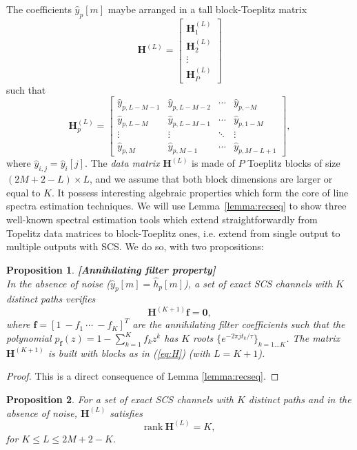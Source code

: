 \documentclass[journal,10pt]{IEEEtran}
\providecommand{\mat}[1]{\boldsymbol{#1}}
\providecommand{\vct}[1]{\boldsymbol{#1}}
\newtheorem{proposition}{Proposition}
\begin{document}
The coefficients $\widehat{y}_p[m]$ maybe arranged in a tall block-Toeplitz matrix 
$$\mat H^{(L)}=\begin{bmatrix}\mat H_1^{(L)}\\ \mat H_2^{(L)}\\ \vdots \\ \mat H_P^{(L)}\end{bmatrix}$$
 such that
\begin{equation}\mat H_p^{(L)}=\begin{bmatrix}
\widehat y_{p,L-M-1} &\widehat y_{p,L-M-2} & \cdots &\widehat y_{p,-M}\\
\widehat y_{p,L-M} &\widehat y_{p,L-M-1} & \cdots &\widehat y_{p,1-M}\\
\vdots &\vdots & \ddots & \vdots \\
\widehat y_{p,M} &\widehat y_{p,M-1} & \cdots &\widehat y_{p,M-L+1}
\end{bmatrix},\label{eq:H}
\end{equation}
where $\widehat y_{i,j}=\widehat y_i[j]$. The \emph{data matrix} $\mat H^{(L)}$ is made of $P$ Toeplitz blocks of size $(2M+2-L)\times L$, and we assume that both block dimensions are larger or equal to $K$. It possess interesting algebraic properties which form the core of line spectra estimation techniques. We will use Lemma~\ref{lemma:recseq} to show three well-known spectral estimation tools which extend straightforwardly from Topelitz data matrices to block-Toeplitz ones, i.e. extend from single output to multiple outputs with SCS. We do so, with two propositions:
\begin{proposition}\label{prop:af}\textbf{[Annihilating filter property]}\\
In the absence of noise ($\widehat y_p[m]=\widehat h_p[m]$), a set of exact SCS channels with $K$ distinct paths verifies
\begin{equation}\mat H^{(K+1)} \vct f =\vct 0,\label{eq:af}\end{equation}
where $\vct f=[1\ -f_1\ \cdots\ -f_K]^T$ are the annihilating filter coefficients such that the polynomial
$p_{\vct f}(z)=1-\sum_{k=1}^K f_k z^{k}$
has $K$ roots $\lbrace e^{-2\pi j t_k/\tau}\rbrace_{k=1\dots K}$. The matrix $\mat H^{(K+1)}$ is built with blocks as in (\ref{eq:H}) (with $L=K+1$).
\end{proposition}
\begin{proof}
This is a direct consequence of Lemma \ref{lemma:recseq}.
\end{proof}
\begin{proposition}\label{prop:lr}
For a set of exact SCS channels with $K$ distinct paths and in the absence of noise, $\mat H^{(L)}$ satisfies
$$\text{rank}\ \mat H^{(L)}= K,$$
for $K\leq L\leq 2M+2-K$.
\end{proposition}
\end{document}
